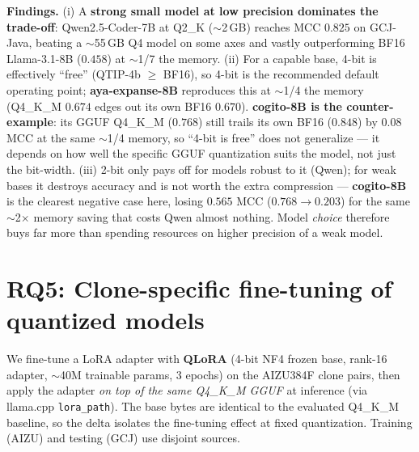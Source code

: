 \documentclass[11pt]{article}
\begin{document}
\noindent\textbf{Findings.} (i) A \textbf{strong small model at low precision
dominates the trade-off}: Qwen2.5-Coder-7B at Q2\_K ($\sim$2\,GB) reaches MCC
$0.825$ on GCJ-Java, beating a $\sim$55\,GB Q4 model on some axes and vastly
outperforming BF16 Llama-3.1-8B ($0.458$) at $\sim$1/7 the memory. (ii) For a
capable base, 4-bit is effectively ``free'' (QTIP-4b $\ge$ BF16), so 4-bit is
the recommended default operating point; \textbf{aya-expanse-8B} reproduces
this at $\sim$1/4 the memory (Q4\_K\_M $0.674$ edges out its own BF16
$0.670$). \textbf{cogito-8B is the counter-example}: its GGUF Q4\_K\_M
($0.768$) still trails its own BF16 ($0.848$) by $0.08$ MCC at the same
$\sim$1/4 memory, so ``4-bit is free'' does not generalize --- it depends on
how well the specific GGUF quantization suits the model, not just the
bit-width. (iii) 2-bit only pays off for models robust to it (Qwen); for weak
bases it destroys accuracy and is not worth the extra compression ---
\textbf{cogito-8B} is the clearest negative case here, losing $0.565$ MCC
($0.768\!\rightarrow\!0.203$) for the same $\sim$2$\times$ memory saving that
costs Qwen almost nothing. Model \emph{choice} therefore buys far more than
spending resources on higher precision of a weak model.

\section{RQ5: Clone-specific fine-tuning of quantized models}
We fine-tune a LoRA adapter with \textbf{QLoRA} (4-bit NF4 frozen base, rank-16
adapter, $\sim$40M trainable params, 3 epochs) on the AIZU384F clone pairs, then
apply the adapter \emph{on top of the same Q4\_K\_M GGUF} at inference (via
llama.cpp \texttt{lora\_path}). The base bytes are identical to the evaluated
Q4\_K\_M baseline, so the delta isolates the fine-tuning effect at fixed
quantization. Training (AIZU) and testing (GCJ) use disjoint sources.
\end{document}

